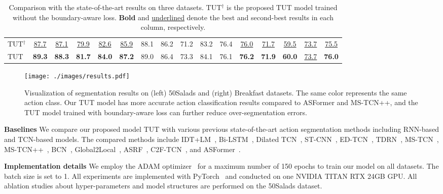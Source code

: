 \documentclass[letterpaper]{article} \usepackage[submission]{aaai23}  \usepackage{times}  \usepackage{helvet}  \usepackage{courier}  \usepackage[hyphens]{url}  \usepackage{graphicx} \urlstyle{rm} \def\UrlFont{\rm}  \usepackage{natbib}  \usepackage{caption} \frenchspacing  \setlength{\pdfpagewidth}{8.5in} \setlength{\pdfpageheight}{11in} \usepackage{algorithm}
\begin{document}
\begin{table*}[t]
\begin{tabular}{l|ccccc|ccccc|ccccc}
\midrule
TUT$^\dag$  & \underline{87.7} & \underline{87.1} & \underline{79.9} & \underline{82.6} & \underline{85.9} & 88.1 & 86.2 & 71.2 & 83.2 &  76.4 &  \underline{76.0} & \underline{71.7} & \underline{59.5} & \underline{73.7} & \underline{75.5}\\
TUT & \textbf{89.3} & \textbf{88.3} & \textbf{81.7} & \textbf{84.0} & \textbf{87.2} & 89.0 & 86.4 & 73.3 & 84.1 & 76.1 & \textbf{76.2} & \textbf{71.9} & \textbf{60.0} & \underline{73.7} & \textbf{76.0}\\
\bottomrule
\end{tabular}
\caption{Comparison with the state-of-the-art results on three datasets. TUT$^\dag$ is the proposed TUT model trained without the boundary-aware loss. \textbf{Bold} and \underline{underlined} denote the best and second-best results in each column, respectively.}
\label{tab:sota}
\end{table*}

\begin{figure*}[t]
\centering
\texttt{[image: ./images/results.pdf]} \caption{Visualization of segmentation results on (left) 50Salads and (right) Breakfast datasets. The same color represents the same action class. Our TUT model has more accurate action classification results compared to ASFormer and MS-TCN++, and the TUT model trained with boundary-aware loss can further reduce over-segmentation errors.}
\label{fig:result}
\end{figure*}

\textbf{Baselines}\quad
We compare our proposed model TUT with various previous state-of-the-art action segmentation methods including RNN-based and TCN-based models. The compared methods include IDT+LM~\cite{richard2016temporal}, Bi-LSTM~\cite{singh2016multi}, Dilated TCN~\cite{lea2017temporal}, ST-CNN~\cite{lea2016segmental}, ED-TCN~\cite{lea2017temporal}, TDRN~\cite{lei2018temporal}, MS-TCN~\cite{farha2019ms}, MS-TCN++~\cite{li2020ms}, BCN~\cite{BCN}, Global2Local~\cite{gao2021global2local}, ASRF~\cite{asrf}, C2F-TCN~\cite{singhania2021coarse}, and ASFormer~\cite{ASFormer}. 

\textbf{Implementation details}\quad
We employ the ADAM optimizer~\cite{adam}  for a maximum number of 150 epochs to train our model on all datasets. The batch size is set to 1. All experiments are implemented with PyTorch~\cite{pytorch} and conducted on one NVIDIA TITAN RTX 24GB GPU. All ablation studies about hyper-parameters and model structures are performed on the 50Salads dataset.
\end{document}
